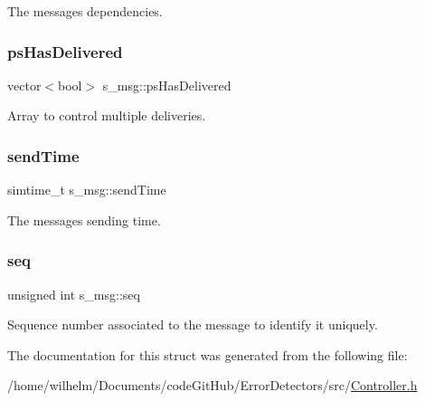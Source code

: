 The message\textquotesingle{}s dependencies. 

\mbox{\label{structs__msg_ac9b1dd0616f30d1eadfdeda272e1b238}} 
\subsubsection{\texorpdfstring{ps\+Has\+Delivered}{psHasDelivered}}
{\footnotesize\ttfamily vector$<$bool$>$ s\+\_\+msg\+::ps\+Has\+Delivered}



Array to control multiple deliveries. 

\mbox{\label{structs__msg_abf4a4c8c468860dec56cb8d69aba81b3}} 
\subsubsection{\texorpdfstring{send\+Time}{sendTime}}
{\footnotesize\ttfamily simtime\+\_\+t s\+\_\+msg\+::send\+Time}



The message\textquotesingle{}s sending time. 

\mbox{\label{structs__msg_a81ee20a1e6b791fdc215d88c0418e618}} 
\subsubsection{\texorpdfstring{seq}{seq}}
{\footnotesize\ttfamily unsigned int s\+\_\+msg\+::seq}



Sequence number associated to the message to identify it uniquely. 



The documentation for this struct was generated from the following file\+:\begin{DoxyCompactItemize}
\item 
/home/wilhelm/\+Documents/code\+Git\+Hub/\+Error\+Detectors/src/\hyperlink{_controller_8h}{Controller.\+h}\end{DoxyCompactItemize}
